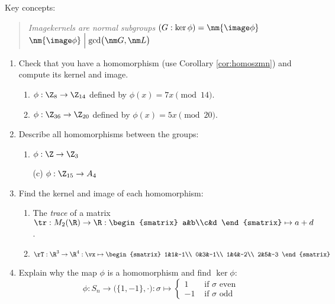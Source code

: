 \begin{exercises}{}{}
	Key concepts:
	\begin{quote}
		\emph{Image\qquad kernels are normal subgroups\qquad 
		$(G:\ker\phi)=\nm{\image\phi}$\qquad
		$\nm{\image\phi}\Bigm|\gcd\bigl(\nm G,\nm L\bigr)$}
	\end{quote}
	
	
	\begin{enumerate}
	  \item Check that you have a homomorphism (use Corollary \ref{cor:homoszmn}) and compute its kernel and image.
	  \begin{enumerate}
	    \item $\phi:\Z_{8}\to\Z_{14}$ defined by $\phi(x)=7x\pmod{14}$.
	    
	    \item $\phi:\Z_{36}\to\Z_{20}$ defined by $\phi(x)=5x\pmod{20}$.
		\end{enumerate}
	
		
		\item Describe all homomorphisms between the groups:
		\begin{enumerate}
		  \item {}\lstsp $\phi:\Z\to\Z_3$ 
		  \item[(c)] \lstsp $\phi:\Z_{15}\to A_4$
		\end{enumerate}
		
			
		\item Find the kernel and image of each homomorphism:
		\begin{enumerate}
		  \item The \emph{trace} of a matrix $\tr:M_2(\R)\to\R:
		  \smash{
			  \begin{smatrix}
					a&b\\c&d
			  \end{smatrix}
		  }
		  \mapsto a+d$.
			
			\item $\rT:\R^3\to\R^4:\vx\mapsto 
			\begin{smatrix}
				1&1&-1\\
				0&3&-1\\
				1&4&-2\\
				2&5&-3
			\end{smatrix}$
		\end{enumerate}
		
		
		\item Explain why the map $\phi$ is a homomorphism and find $\ker\phi$:
		\[
			\phi:S_n\to \bigl(\{1,-1\},\cdot\bigr):\sigma \mapsto 
			\begin{cases}
	  		1&\text{ if $\sigma$ even}\\
	  		-1&\text{ if $\sigma$ odd}
			\end{cases}
		\]
	

\end{enumerate}
\end{exercises}
